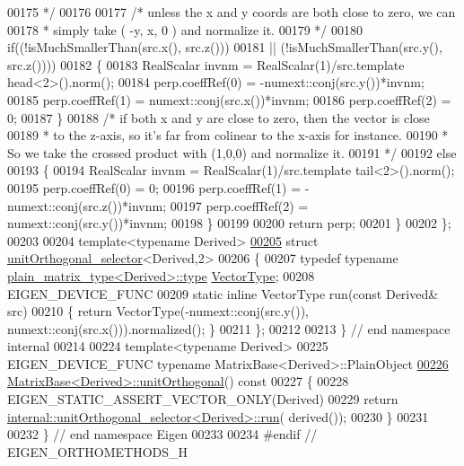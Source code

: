 \begin{DoxyCode}
00175 \textcolor{comment}{     */}
00176 
00177     \textcolor{comment}{/* unless the x and y coords are both close to zero, we can}
00178 \textcolor{comment}{     * simply take ( -y, x, 0 ) and normalize it.}
00179 \textcolor{comment}{     */}
00180     \textcolor{keywordflow}{if}((!isMuchSmallerThan(src.x(), src.z()))
00181     || (!isMuchSmallerThan(src.y(), src.z())))
00182     \{
00183       RealScalar invnm = RealScalar(1)/src.template head<2>().norm();
00184       perp.coeffRef(0) = -numext::conj(src.y())*invnm;
00185       perp.coeffRef(1) = numext::conj(src.x())*invnm;
00186       perp.coeffRef(2) = 0;
00187     \}
00188     \textcolor{comment}{/* if both x and y are close to zero, then the vector is close}
00189 \textcolor{comment}{     * to the z-axis, so it's far from colinear to the x-axis for instance.}
00190 \textcolor{comment}{     * So we take the crossed product with (1,0,0) and normalize it.}
00191 \textcolor{comment}{     */}
00192     \textcolor{keywordflow}{else}
00193     \{
00194       RealScalar invnm = RealScalar(1)/src.template tail<2>().norm();
00195       perp.coeffRef(0) = 0;
00196       perp.coeffRef(1) = -numext::conj(src.z())*invnm;
00197       perp.coeffRef(2) = numext::conj(src.y())*invnm;
00198     \}
00199 
00200     \textcolor{keywordflow}{return} perp;
00201    \}
00202 \};
00203 
00204 \textcolor{keyword}{template}<\textcolor{keyword}{typename} Derived>
\hyperlink{struct_eigen_1_1internal_1_1unit_orthogonal__selector_3_01_derived_00_012_01_4}{00205} \textcolor{keyword}{struct }\hyperlink{struct_eigen_1_1internal_1_1unit_orthogonal__selector}{unitOrthogonal\_selector}<Derived,2>
00206 \{
00207   \textcolor{keyword}{typedef} \textcolor{keyword}{typename} \hyperlink{struct_eigen_1_1internal_1_1plain__matrix__type}{plain\_matrix\_type<Derived>::type} 
      \hyperlink{struct_vector_type}{VectorType};
00208   EIGEN\_DEVICE\_FUNC
00209   \textcolor{keyword}{static} \textcolor{keyword}{inline} VectorType run(\textcolor{keyword}{const} Derived& src)
00210   \{ \textcolor{keywordflow}{return} VectorType(-numext::conj(src.y()), numext::conj(src.x())).normalized(); \}
00211 \};
00212 
00213 \} \textcolor{comment}{// end namespace internal}
00214 
00224 \textcolor{keyword}{template}<\textcolor{keyword}{typename} Derived>
00225 EIGEN\_DEVICE\_FUNC \textcolor{keyword}{typename} MatrixBase<Derived>::PlainObject
\hyperlink{group___geometry___module_ga2fd7a02d7bc4c339f0e97f12c09acb25}{00226} \hyperlink{group___geometry___module_ga2fd7a02d7bc4c339f0e97f12c09acb25}{MatrixBase<Derived>::unitOrthogonal}()\textcolor{keyword}{ const}
00227 \textcolor{keyword}{}\{
00228   EIGEN\_STATIC\_ASSERT\_VECTOR\_ONLY(Derived)
00229   \textcolor{keywordflow}{return} \hyperlink{struct_eigen_1_1internal_1_1unit_orthogonal__selector}{internal::unitOrthogonal\_selector<Derived>::run}(
      derived());
00230 \}
00231 
00232 \} \textcolor{comment}{// end namespace Eigen}
00233 
00234 \textcolor{preprocessor}{#endif // EIGEN\_ORTHOMETHODS\_H}
\end{DoxyCode}
